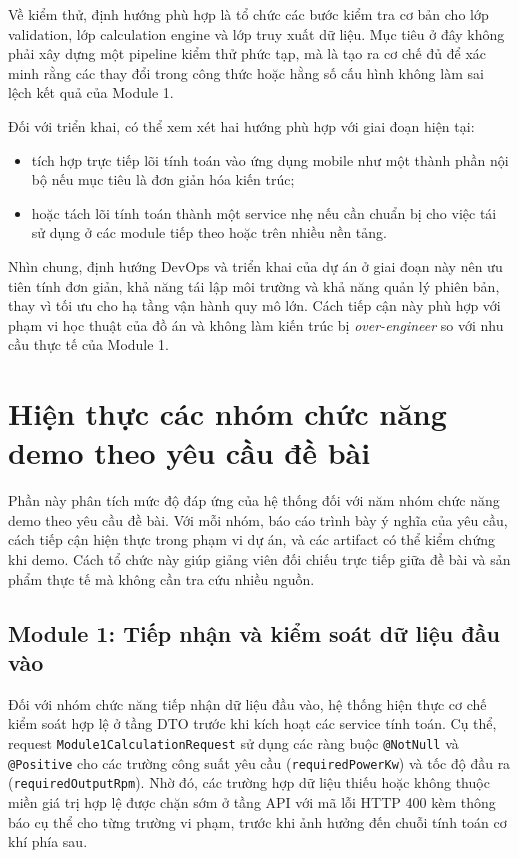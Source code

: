\documentclass[a4paper]{article}
\begin{document}
Về kiểm thử, định hướng phù hợp là tổ chức các bước kiểm tra cơ bản cho lớp validation, lớp calculation engine và lớp truy xuất dữ liệu. Mục tiêu ở đây không phải xây dựng một pipeline kiểm thử phức tạp, mà là tạo ra cơ chế đủ để xác minh rằng các thay đổi trong công thức hoặc hằng số cấu hình không làm sai lệch kết quả của Module 1.

Đối với triển khai, có thể xem xét hai hướng phù hợp với giai đoạn hiện tại:

\begin{itemize}
\item tích hợp trực tiếp lõi tính toán vào ứng dụng mobile như một thành phần nội bộ nếu mục tiêu là đơn giản hóa kiến trúc;
\item hoặc tách lõi tính toán thành một service nhẹ nếu cần chuẩn bị cho việc tái sử dụng ở các module tiếp theo hoặc trên nhiều nền tảng.
\end{itemize}

Nhìn chung, định hướng DevOps và triển khai của dự án ở giai đoạn này nên ưu tiên tính đơn giản, khả năng tái lập môi trường và khả năng quản lý phiên bản, thay vì tối ưu cho hạ tầng vận hành quy mô lớn. Cách tiếp cận này phù hợp với phạm vi học thuật của đồ án và không làm kiến trúc bị \textit{over-engineer} so với nhu cầu thực tế của Module 1.

\section{Hiện thực các nhóm chức năng demo theo yêu cầu đề bài}

Phần này phân tích mức độ đáp ứng của hệ thống đối với năm nhóm chức năng demo theo yêu cầu đề bài. Với mỗi nhóm, báo cáo trình bày ý nghĩa của yêu cầu, cách tiếp cận hiện thực trong phạm vi dự án, và các artifact có thể kiểm chứng khi demo. Cách tổ chức này giúp giảng viên đối chiếu trực tiếp giữa đề bài và sản phẩm thực tế mà không cần tra cứu nhiều nguồn.

\subsection{Module 1: Tiếp nhận và kiểm soát dữ liệu đầu vào}

Đối với nhóm chức năng tiếp nhận dữ liệu đầu vào, hệ thống hiện thực cơ chế kiểm soát hợp lệ ở tầng DTO trước khi kích hoạt các service tính toán. Cụ thể, request \texttt{Module1CalculationRequest} sử dụng các ràng buộc \texttt{@NotNull} và \texttt{@Positive} cho các trường công suất yêu cầu (\texttt{requiredPowerKw}) và tốc độ đầu ra (\texttt{requiredOutputRpm}). Nhờ đó, các trường hợp dữ liệu thiếu hoặc không thuộc miền giá trị hợp lệ được chặn sớm ở tầng API với mã lỗi HTTP 400 kèm thông báo cụ thể cho từng trường vi phạm, trước khi ảnh hưởng đến chuỗi tính toán cơ khí phía sau.
\end{document}
